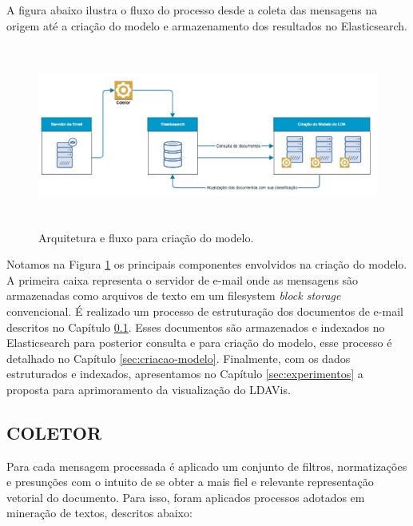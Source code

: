 \documentclass[12pt,a4paper]{article}
\begin{document}
 A figura abaixo ilustra o fluxo do processo desde a coleta das mensagens na origem até a criação do modelo e armazenamento dos resultados no Elasticsearch.

 \begin{figure}[H]
	\centering
    \includegraphics[height=6cm]{images/figure_11.jpg}
    \caption{Arquitetura e fluxo para criação do modelo.}
    \label{fig-framework-lda}
\end{figure}

Notamos na Figura \ref{fig-framework-lda} os principais componentes envolvidos na criação do modelo. A primeira caixa representa o servidor de 
 e-mail onde as mensagens são armazenadas como arquivos de texto em um filesystem \textit{block storage} convencional. É realizado um processo de
 estruturação dos documentos de e-mail descritos no Capítulo \ref{sec:coletor}. Esses documentos são armazenados e indexados no Elasticsearch para
 posterior consulta e para criação do modelo, esse processo é detalhado no Capítulo \ref{sec:criacao-modelo}. Finalmente, com os dados estruturados
 e indexados, apresentamos no Capítulo \ref{sec:experimentos} a proposta para aprimoramento da visualização do LDAVis.

\subsection{COLETOR} \label{sec:coletor}
Para cada mensagem processada é aplicado um conjunto de filtros, normatizações e presunções com o intuito de se obter a mais fiel e relevante representação vetorial do documento.
 Para isso, foram aplicados processos adotados em mineração de textos, descritos abaixo:
\end{document}
